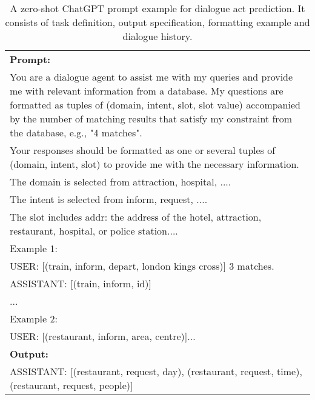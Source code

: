 \documentclass[letterpaper]{article} %
\begin{document}
\begin{table}[htbp]
    \centering
    \tiny
    \begin{tabular}{p{.95\linewidth}}
    \toprule
     \textbf{Prompt:}
     \\
     \textcolor{mypurple1}{You are a dialogue agent to assist me with my queries and provide me with relevant information from a database. My questions are formatted as tuples of (domain, intent, slot, slot value) accompanied by the number of matching results that satisfy my constraint from the database, e.g., "4 matches".} 
    \\ \textcolor{myyellow1}{Your responses should be formatted as one or several tuples of (domain, intent, slot) to provide me with the necessary information.} 
    \\ \textcolor{myyellow1}{The domain is selected from attraction, hospital, ....} 
    \\ \textcolor{myyellow1}{The intent is selected from inform, request, ....} 
    \\ \textcolor{myyellow1}{The slot includes addr: the address of the hotel, attraction, restaurant, hospital, or police station....}   
    \\ \textcolor{myblue1}{Example 1:} 
    \\ \textcolor{myblue1}{USER: [(train, inform, depart, london kings cross)] 3 matches.} 
    \\ \textcolor{myblue1}{ASSISTANT: [(train, inform, id)]} 
    \\ ... 
    \\ \textcolor{myred1}{Example 2:} 
    \\ \textcolor{myred1}{USER: [(restaurant, inform, area, centre)]}... 
    \\ \hline
       \textbf{Output:}  \\
       ASSISTANT: [(restaurant, request, day), (restaurant, request, time), (restaurant, request, people)]\\
    \bottomrule
    \end{tabular}
    \caption{A zero-shot ChatGPT prompt example for dialogue act prediction. It consists of \textcolor{mypurple1}{task definition}, \textcolor{myyellow1}{output specification}, \textcolor{myblue1}{formatting example} and \textcolor{myred1}{dialogue history}. }
    \label{tab:chatgpt_prompt}
\end{table}
\end{document}
